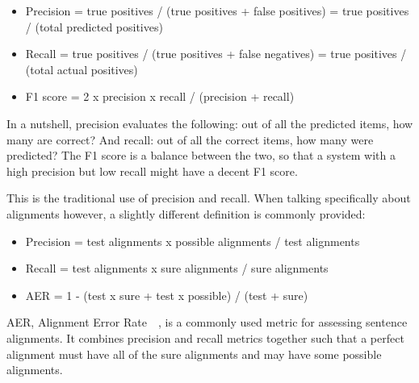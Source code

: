 \begin{itemize}
    \item Precision =  true positives / (true positives + false positives) = true positives / (total predicted positives)
    \item Recall =  true positives / (true positives + false negatives) = true positives / (total actual positives)
    \item F1 score = 2 x precision x recall / (precision + recall)
\end{itemize}

In a nutshell, precision evaluates the following: out of all the predicted items, how many are correct? And recall: out of all the correct items, how many were predicted? The F1 score is a balance between the two, so that a system with a high precision but low recall might have a decent F1 score.

This is the traditional use of precision and recall. When talking specifically about alignments however, a slightly different definition is commonly provided:

\begin{itemize}
    \item Precision =  test alignments x possible alignments / test alignments
    \item Recall =  test alignments x sure alignments / sure alignments
    \item AER = 1 - (test x sure + test x possible) / (test + sure)
\end{itemize}

AER, Alignment Error Rate~\cite{mihalcea2003evaluation}~\cite{koehn2009statistical}, is a commonly used metric for assessing sentence alignments. It combines precision and recall metrics together such that a perfect alignment must have all of the sure alignments and may have some possible alignments.
